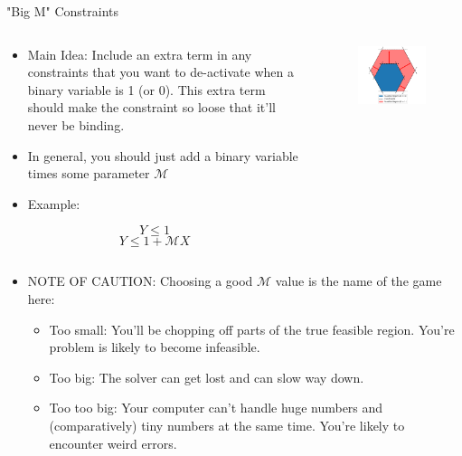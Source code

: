 \documentclass[10pt, aspectratio=169]{beamer}
\begin{document}
\begin{frame}{"Big M" Constraints}
    \vspace{-0.4cm}
    \begin{columns}
        \begin{column}{0.5\textwidth}
            \begin{itemize}
                \item Main Idea: Include an extra term in any constraints that you want to de-activate when a binary variable is 1 (or 0). This extra term should make the constraint so loose that it'll never be binding.
                \item In general, you should just add a binary variable times some  parameter $\mathcal{M}$
                \item Example:
            \end{itemize}
            $$Y \leq 1$$
            $$Y \leq 1 + \mathcal{M} X$$
        \end{column}
        \begin{column}{0.5\textwidth}
            \begin{figure}
                \includegraphics[width=0.8\linewidth]{ExpandedBigM.png}
            \end{figure}
        \end{column}
    \end{columns}
    \begin{itemize}
        \item NOTE OF CAUTION: Choosing a good $\mathcal{M}$ value is the name of the game here:
        \begin{itemize}
            \item Too small: You'll be chopping off parts of the true feasible region. You're problem is likely to become infeasible.
            \item Too big: The solver can get lost and can slow way down.
            \item Too too big: Your computer can't handle huge numbers and (comparatively) tiny numbers at the same time. You're likely to encounter weird errors.
        \end{itemize}
    \end{itemize}
\end{frame}
\end{document}
